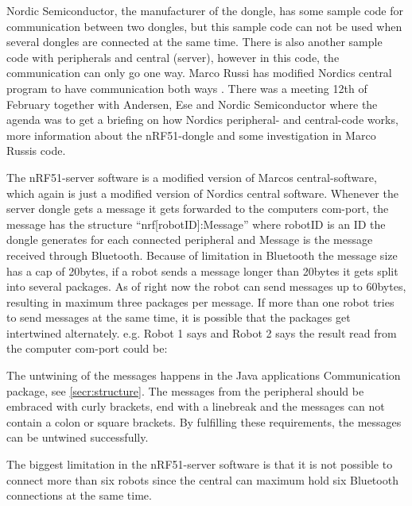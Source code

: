 Nordic Semiconductor, the manufacturer of the dongle, has some sample code for communication between two dongles, but this sample code can not be used when several dongles are connected at the same time. There is also another sample code with peripherals and central (server), however in this code, the communication can only go one way. Marco Russi has modified Nordics central program to have communication both ways \cite{marcoRussi}. There was a meeting 12th of February together with Andersen, Ese and Nordic Semiconductor where the agenda was to get a briefing on how Nordics peripheral- and central-code works, more information about the nRF51-dongle and some investigation in Marco Russis code.

The nRF51-server software is a modified version of Marcos central-software, which again is just a modified version of Nordics central software. Whenever the server dongle gets a message it gets forwarded to the computers \acrshort{com}-port, the message has the structure ``nrf[robotID]:Message'' where robotID is an ID the dongle generates for each connected peripheral and Message is the message received through Bluetooth. Because of limitation in Bluetooth the message size has a cap of 20bytes, if a robot sends a message longer than 20bytes it gets split into several packages. As of right now the robot can send messages up to 60bytes, resulting in maximum three packages per message. If more than one robot tries to send messages at the same time, it is possible that the packages get intertwined alternately. e.g. Robot 1 says  and Robot 2 says  the result read from the computer \acrshort{com}-port could be: 

The untwining of the messages happens in the Java applications Communication package, see \ref{secr:structure}. The messages from the peripheral should be embraced with curly brackets, end with a linebreak and the messages can not contain a colon or square brackets. By fulfilling these requirements, the messages can be untwined successfully.

The biggest limitation in the nRF51-server software is that it is not possible to connect more than six robots since the central can maximum hold six Bluetooth connections at the same time.

